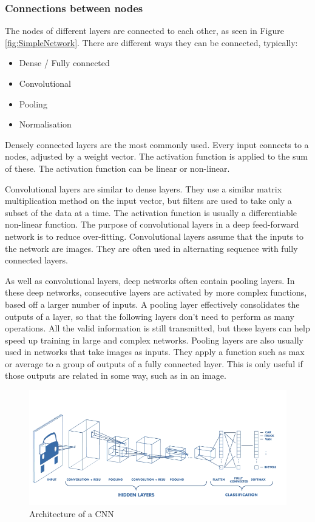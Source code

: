 \subsubsection{Connections between nodes}

The nodes of different layers are connected to each other, as seen in Figure \ref{fig:SimpleNetwork}. There are different ways they can be connected, typically:

\begin{itemize}
    \item Dense / Fully connected
    \item Convolutional
    \item Pooling
    \item Normalisation
\end{itemize}

Densely connected layers are the most commonly used. Every input connects to a nodes, adjusted by a weight vector. The activation function is applied to the sum of these\cite{intro_ml}. The activation function can be linear or non-linear.

Convolutional layers are similar to dense layers. They use a similar matrix multiplication method on the input vector, but filters are used to take only a subset of the data\cite{hidden_layers} at a time. The activation function is usually a differentiable non-linear function. The purpose of convolutional layers in a deep feed-forward network is to reduce over-fitting. Convolutional layers assume that the inputs to the network are images. They are often used in alternating sequence with fully connected layers.

As well as convolutional layers, deep networks often contain pooling layers. In these deep networks, consecutive layers are activated by more complex functions, based off a larger number of inputs. A pooling layer effectively consolidates the outputs of a layer, so that the following layers don't need to perform as many operations. All the valid information is still transmitted, but these layers can help speed up training in large and complex networks\cite{hidden_layers}. Pooling layers are also usually used in networks that take images as inputs. They apply a function such as max or average to a group of outputs of a fully connected layer. This is only useful if those outputs are related in some way, such as in an image.

\begin{figure}[H]
\caption{Architecture of a CNN}
\label{fig:Convolutional}
\centering
\includegraphics[width=1.0\textwidth]{Figures/convolutional.png}
\end{figure}

